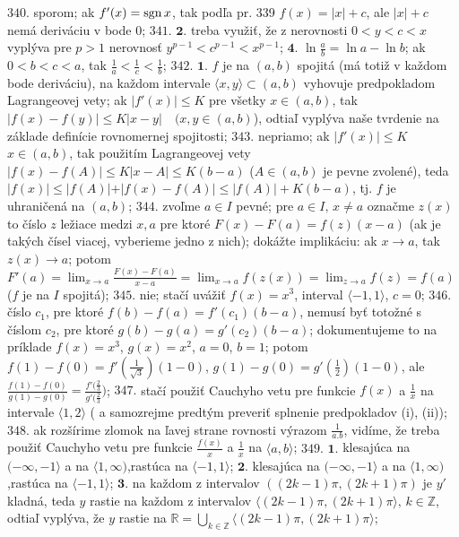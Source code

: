 $\boxed{340.}$ sporom; ak $f'(x)=\operatorname{sgn} x$, tak podľa pr. 339 $f(x)=\vert x\vert +c$, ale  $\vert x\vert +c$ nemá deriváciu v bode $0$;
$\boxed{341.}$ $\boldsymbol{2.}$ treba využiť, že z nerovnosti $0<y<c<x$ vyplýva pre $p>1$ nerovnosť $y^{p-1}<c^{p-1}<x^{p-1}$;
$\boldsymbol{4.}$  $\ln \frac{a}{b}= \ln a-\ln b$; ak $0<b<c<a$, tak $\frac{1}{a}<\frac{1}{c}<\frac{1}{b}$;
$\boxed{342.}$ $\boldsymbol{1.}$ $f$ je na $(a,b)$ spojitá (má totiž v každom bode deriváciu), na každom intervale $\langle x,y \rangle \subset (a,b)$ vyhovuje predpokladom Lagrangeovej vety; ak $\vert f'(x)\vert \leq K$ pre všetky $x \in (a,b)$, tak $\vert f(x)-f(y)\vert \leq K \vert x-y\vert\quad (x,y \in (a,b)$), odtiaľ vyplýva naše tvrdenie na základe definície rovnomernej spojitosti;
$\boxed{343.}$ nepriamo;  ak $\vert f'(x)\vert \leq K$   $x \in (a,b)$, tak použitím Lagrangeovej vety $\vert f(x)-f(A)\vert \leq K \vert x-A\vert \leq K(b-a)$  ($A \in (a,b)$ je pevne zvolené), teda $ \vert f(x) \vert \leq \vert f(A) \vert + \vert f(x)-f(A)  \vert \leq  \vert f(A) \vert+K(b-a)$, tj. $f$ je uhraničená na $(a,b)$;
$\boxed{344.}$ zvoľme $a \in I$ pevné; pre $a \in I, \, x \ne a$ označme $z(x)$ to číslo $z$ ležiace medzi $x,a $ pre ktoré $F(x) - F(a) = f(z)(x-a)$ (ak je takých čísel viacej, vyberieme jedno z nich); dokážte implikáciu: ak $x\rightarrow a$, tak $z(x) \rightarrow a$; potom $F'(a)=\lim_{x \to a}\frac{F(x) - F(a)}{x-a}=\lim_{x \to a}f(z(x))=\lim_{z \to a}f(z)=f(a)$ ($f$ je na $I$ spojitá);
$\boxed{345.}$ nie; stačí uvážiť $f(x)=x^{3}$, interval $\langle -1,1 \rangle$, $c=0$;
$\boxed{346.}$ číslo $c_{1}$, pre ktoré $f(b)-f(a)=f'(c_{1})(b-a)$, nemusí byť totožné s číslom $c_{2}$, pre ktoré $g(b)-g(a)=g'(c_{2})(b-a)$; dokumentujeme to na príklade $f(x)=x^{3}$, $g(x)=x^{2}$, $a=0$, $b=1$; potom $f(1)-f(0)=f'(\frac{1}{\sqrt{3}})(1-0)$,  $g(1)-g(0)=g'(\frac{1}{2})(1-0)$, ale $\frac{f(1)-f(0)}{g(1)-g(0)}=\frac{f'(\frac{2}{3}}{g'(\frac{2}{3}})$;
$\boxed{347.}$ stačí použiť Cauchyho vetu pre funkcie $f(x)$ a $\frac{1}{x}$ na intervale $\langle 1,2 \rangle$ ( a samozrejme predtým preveriť splnenie predpokladov (i), (ii));
$\boxed{348.}$ ak rozšírime zlomok na ľavej strane rovnosti výrazom $\frac{1}{a.b}$, vidíme, že treba použiť Cauchyho vetu pre funkcie $\frac{f(x)}{x}$  a  $\frac{1}{x}$ na $\langle a,b \rangle$;
$\boxed{349.}$ $\boldsymbol{1.}$ klesajúca na $(-\infty,-1 \rangle$ a na $\langle 1,\infty) $,rastúca na $\langle -1,1\rangle $;
$\boldsymbol{2.}$ klesajúca na $(-\infty,-1 \rangle$ a na $\langle 1,\infty) $,rastúca na $\langle -1,1\rangle $;
$\boldsymbol{3.}$  na každom z intervalov $((2k-1)\pi,(2k+1)\pi)$ je $y'$ kladná, teda  $y$ rastie na každom z intervalov $\langle (2k-1)\pi,(2k+1)\pi\rangle, \, k\in \mathbb{Z}$, odtiaľ vyplýva, že $y$ rastie na $\mathbb{R}= \bigcup_{k\in \mathbb{Z}}\langle (2k-1)\pi,(2k+1)\pi\rangle $;
